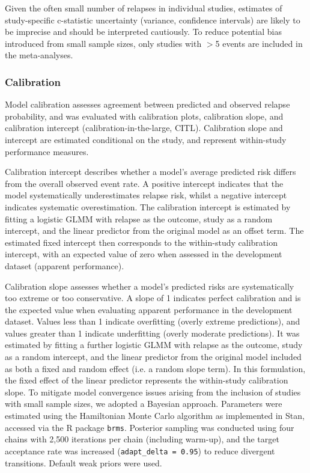 Given the often small number of relapses in individual studies, estimates of study-specific c-statistic uncertainty (variance, confidence intervals) are likely to be imprecise and should be interpreted cautiously. To reduce potential bias introduced from small sample sizes, only studies with $>$5 events are included in the meta-analyses\cite{obuchowski1998, hanczar2010}.

\subsubsection{Calibration}

Model calibration assesses agreement between predicted and observed relapse probability, and was evaluated with calibration plots, calibration slope, and calibration intercept (calibration-in-the-large, CITL). Calibration slope and intercept are estimated conditional on the study, and represent within-study performance measures\cite{wynants2018}.

Calibration intercept describes whether a model's average predicted risk differs from the overall observed event rate. A positive intercept indicates that the model systematically underestimates relapse risk, whilst a negative intercept indicates systematic overestimation. The calibration intercept is estimated by fitting a logistic GLMM with relapse as the outcome, study as a random intercept, and the linear predictor from the original model as an offset term. The estimated fixed intercept then corresponds to the within-study calibration intercept, with an expected value of zero when assessed in the development dataset (apparent performance)\cite{wynants2018}.

Calibration slope assesses whether a model's predicted risks are systematically too extreme or too conservative. A slope of 1 indicates perfect calibration and is the expected value when evaluating apparent performance in the development dataset. Values less than 1 indicate overfitting (overly extreme predictions), and values greater than 1 indicate underfitting (overly moderate predictions). It was estimated by fitting a further logistic GLMM with relapse as the outcome, study as a random intercept, and the linear predictor from the original model included as both a fixed and random effect (i.e. a random slope term)\cite{wynants2018}. In this formulation, the fixed effect of the linear predictor represents the within-study calibration slope. To mitigate model convergence issues arising from the inclusion of studies with small sample sizes, we adopted a Bayesian approach. Parameters were estimated using the Hamiltonian Monte Carlo algorithm as implemented in Stan, accessed via the R package \texttt{brms}\cite{burkner2017, stan_manual}. Posterior sampling was conducted using four chains with 2,500 iterations per chain (including warm-up), and the target acceptance rate was increased (\texttt{adapt\_delta = 0.95}) to reduce divergent transitions. Default weak priors were used.

